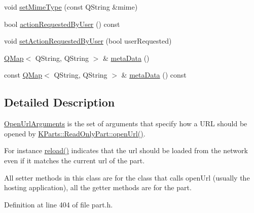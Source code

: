 \begin{DoxyCompactItemize}
\item 
void \hyperlink{classKParts_1_1OpenUrlArguments_aa3c7601bb5f1ecfa1ed23009f7dfdc87}{set\+Mime\+Type} (const Q\+String \&mime)
\item 
bool \hyperlink{classKParts_1_1OpenUrlArguments_ab581f9d940912f8e8967f34c56cd2e29}{action\+Requested\+By\+User} () const 
\item 
void \hyperlink{classKParts_1_1OpenUrlArguments_ac3e9c56a054c7d5fb882e5724f713041}{set\+Action\+Requested\+By\+User} (bool user\+Requested)
\item 
\hyperlink{classQMap}{Q\+Map}$<$ Q\+String, Q\+String $>$ \& \hyperlink{classKParts_1_1OpenUrlArguments_a8c85d3cfe28606c6101f382158468d72}{meta\+Data} ()
\item 
const \hyperlink{classQMap}{Q\+Map}$<$ Q\+String, Q\+String $>$ \& \hyperlink{classKParts_1_1OpenUrlArguments_abf11199bbcb7496af97a0058c1a2c7f6}{meta\+Data} () const 
\end{DoxyCompactItemize}


\subsection{Detailed Description}
\hyperlink{classKParts_1_1OpenUrlArguments}{Open\+Url\+Arguments} is the set of arguments that specify how a U\+R\+L should be opened by \hyperlink{classKParts_1_1ReadOnlyPart_a1ff41b28f8da57ccc380e0c092a50c0c}{K\+Parts\+::\+Read\+Only\+Part\+::open\+Url()}.

For instance \hyperlink{classKParts_1_1OpenUrlArguments_a75c903644fed82bc1982cededcb1c05a}{reload()} indicates that the url should be loaded from the network even if it matches the current url of the part.

All setter methods in this class are for the class that calls open\+Url (usually the hosting application), all the getter methods are for the part. 

Definition at line 404 of file part.\+h.



